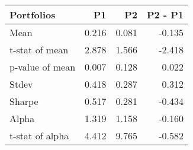 \begin{tabular}{lrrr}
\toprule
Portfolios & P1 & P2 & P2 - P1 \\
\midrule
Mean & 0.216 & 0.081 & -0.135 \\
t-stat of mean & 2.878 & 1.566 & -2.418 \\
p-value of mean & 0.007 & 0.128 & 0.022 \\
Stdev & 0.418 & 0.287 & 0.312 \\
Sharpe & 0.517 & 0.281 & -0.434 \\
Alpha & 1.319 & 1.158 & -0.160 \\
t-stat of alpha & 4.412 & 9.765 & -0.582 \\
\bottomrule
\end{tabular}
